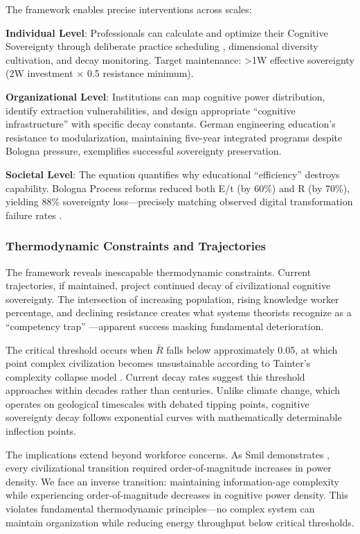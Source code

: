 The framework enables precise interventions across scales:

\textbf{Individual Level}: Professionals can calculate and optimize their Cognitive Sovereignty through deliberate practice scheduling \citep{ericsson1993}, dimensional diversity cultivation, and decay monitoring. Target maintenance: >1W effective sovereignty (2W investment × 0.5 resistance minimum).

\textbf{Organizational Level}: Institutions can map cognitive power distribution, identify extraction vulnerabilities, and design appropriate ``cognitive infrastructure'' with specific decay constants. German engineering education's resistance to modularization, maintaining five-year integrated programs despite Bologna pressure, exemplifies successful sovereignty preservation.

\textbf{Societal Level}: The equation quantifies why educational ``efficiency'' destroys capability. Bologna Process reforms reduced both E/t (by 60\%) and R (by 70\%), yielding 88\% sovereignty loss—precisely matching observed digital transformation failure rates \citep{bain2024}.

\subsubsection{Thermodynamic Constraints and Trajectories}

The framework reveals inescapable thermodynamic constraints. Current trajectories, if maintained, project continued decay of civilizational cognitive sovereignty. The intersection of increasing population, rising knowledge worker percentage, and declining resistance creates what systems theorists recognize as a ``competency trap'' \citep{levitt1988}—apparent success masking fundamental deterioration.

The critical threshold occurs when $\bar{R}$ falls below approximately 0.05, at which point complex civilization becomes unsustainable according to Tainter's complexity collapse model \citep{tainter1988}. Current decay rates suggest this threshold approaches within decades rather than centuries. Unlike climate change, which operates on geological timescales with debated tipping points, cognitive sovereignty decay follows exponential curves with mathematically determinable inflection points.

The implications extend beyond workforce concerns. As Smil demonstrates \citep{smil2017}, every civilizational transition required order-of-magnitude increases in power density. We face an inverse transition: maintaining information-age complexity while experiencing order-of-magnitude decreases in cognitive power density. This violates fundamental thermodynamic principles—no complex system can maintain organization while reducing energy throughput below critical thresholds.

